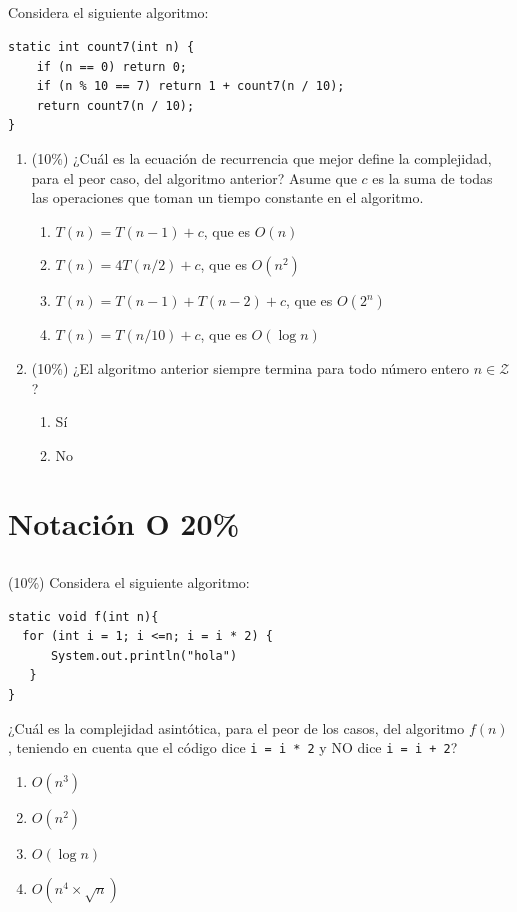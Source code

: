 \documentclass[10 pt]{article}
\begin{document}
\begin{multicols}{2}
\subsection{} Considera el siguiente algoritmo:
\begin{lstlisting}
static int count7(int n) {
    if (n == 0) return 0;
    if (n % 10 == 7) return 1 + count7(n / 10);
    return count7(n / 10);
}
\end{lstlisting}
\begin{enumerate}[label=\alph*]
	\item (10\%) ¿Cuál es la ecuación de recurrencia que mejor define la complejidad, para el peor caso, del algoritmo anterior?  Asume que $c$ es la suma de todas las operaciones que toman un tiempo constante en el algoritmo.
	\begin{enumerate}[label=\roman*]
		\item $T(n) = T(n-1) + c$, que es $O(n)$
		\item $T(n) = 4T(n/2) + c$, que es $O(n^2)$
		\item $T(n) = T(n-1) + T(n-2) + c$, que es $O(2^n)$
		\item $T(n) = T(n/10) + c$, que es $O(\log n)$
	\end{enumerate}
	\item (10\%) ¿El algoritmo anterior siempre termina para todo número entero $n \in \mathcal{Z}$? 
	\begin{enumerate}[label=\roman*]
		\item Sí
		\item No
	\end{enumerate}
\end{enumerate}
\section{Notación O 20\%}
\subsection{} (10\%) Considera el siguiente algoritmo:
\begin{lstlisting}
static void f(int n){
  for (int i = 1; i <=n; i = i * 2) {
      System.out.println("hola")
   }
}
\end{lstlisting}
¿Cuál es la complejidad asintótica, para el peor de los casos, del algoritmo $f(n)$, teniendo en cuenta que el código dice \texttt{i = i * 2} y NO dice \texttt{i = i + 2}?
\begin{enumerate}[label=\alph*]
	\item $O(n^3)$
	\item $O(n^2)$
	\item $O(\log n)$
	\item $O(n ^ 4 \times \sqrt{n})$
\end{enumerate}

\end{multicols}
\end{document}
